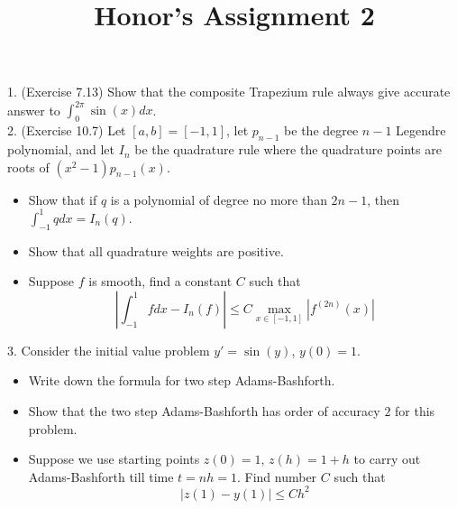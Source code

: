 \documentclass[20pt]{article} %
\title{Honor's Assignment 2}
\theoremstyle{break}
\begin{document}
\maketitle

1. (Exercise 7.13) Show that the composite Trapezium rule always give accurate answer to $\int_0^{2\pi}\sin(x)dx$.\\  

2. (Exercise 10.7) Let $[a, b]=[-1, 1]$, let $p_{n-1}$ be the degree $n-1$ Legendre polynomial, and let $I_n$ be the quadrature rule where the quadrature points are roots of $(x^2-1)p_{n-1}(x)$.
\begin{itemize}
\item Show that if $q$ is a polynomial of degree no more than $2n-1$, then $\int_{-1}^1qdx=I_n(q)$.
\item Show that all quadrature weights are positive.
\item Suppose $f$ is smooth, find a constant $C$ such that
  \[|\int_{-1}^1fdx-I_n(f)|\leq C\max_{x\in [-1, 1]}|f^{(2n)}(x)|\]
\end{itemize}


3. Consider the initial value problem $y'=\sin(y)$, $y(0)=1$.

\begin{itemize}
\item Write down the formula for two step Adams-Bashforth.
\item Show that the two step Adams-Bashforth has order of accuracy $2$ for this problem.
\item Suppose we use starting points $z(0)=1$, $z(h)=1+h$ to carry out Adams-Bashforth till time $t=nh=1$. Find number $C$ such that
  \[|z(1)-y(1)|\leq Ch^2\]
\end{itemize}
\end{document}
